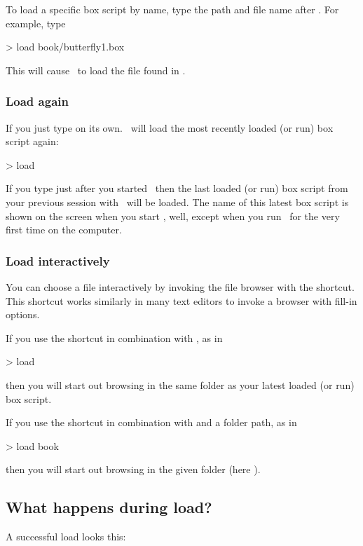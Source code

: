To load a specific box script by name, type the path and file name after . For example, type
\begin{usdialog}
> load book/butterfly1.box
\end{usdialog}

This will cause \US\ to load the file found in .

\subsubsection{Load again}
If you just type  on its own. \US\ will load the most recently loaded (or run) box script again:
\begin{usdialog}
> load 
\end{usdialog}

If you type  just after you started \US\ then the last loaded (or run) box script from your previous session with \US\ will be loaded. The name of this latest box script is shown on the screen when you start \US, well, except when you run \US\ for the very first time on the computer.

\subsubsection{Load interactively}
You can choose a file interactively by invoking the file browser with the  shortcut. This shortcut works similarly in many text editors to invoke a browser with fill-in options.

If you use the shortcut in combination with , as in
\begin{usdialog}
> load %
\end{usdialog}
\noindent then you will start out browsing in the same folder as your latest loaded (or run) box script.

If you use the shortcut in combination with  and a folder path, as in
\begin{usdialog}
> load book %
\end{usdialog}
\noindent then you will start out browsing in the given folder (here ).

\subsection{What happens during load?}
A successful load looks this:

